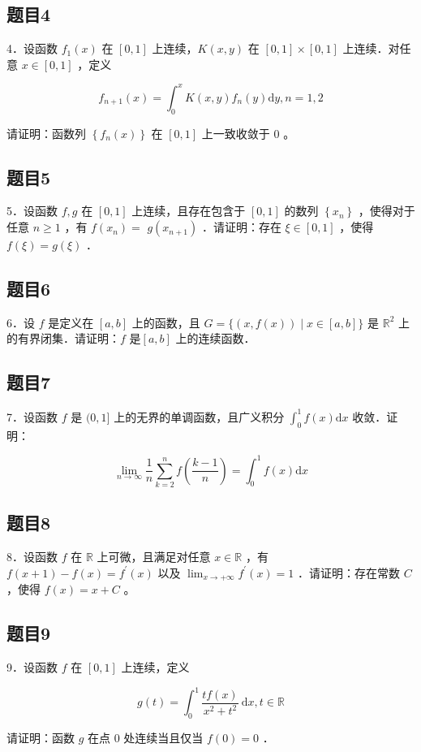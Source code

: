 \documentclass{article}
\begin{document}
\subsection{题目4}
4．设函数 \(f_{1}(x)\) 在 \([0,1]\) 上连续，\(K(x, y)\) 在 \([0,1] \times[0,1]\) 上连续．对任意 \(x \in[0,1]\) ，定义

\[
f_{n+1}(x)=\int_{0}^{x} K(x, y) f_{n}(y) \mathrm{d} y, n=1,2
\]

请证明：函数列 \(\left\{f_{n}(x)\right\}\) 在 \([0,1]\) 上一致收敛于 0 。

\subsection{题目5}
5．设函数 \(f, g\) 在 \([0,1]\) 上连续，且存在包含于 \([0,1]\) 的数列 \(\left\{x_{n}\right\}\) ，使得对于任意 \(n \geq 1\) ，有 \(f\left(x_{n}\right)=\) \(g\left(x_{n+1}\right)\) ．请证明：存在 \(\xi \in[0,1]\) ，使得 \(f(\xi)=g(\xi)\) ．

\subsection{题目6}
6．设 \(f\) 是定义在 \([a, b]\) 上的函数，且 \(G=\{(x, f(x)) \mid x \in[a, b]\}\) 是 \(\mathbb{R}^{2}\) 上的有界闭集．请证明：\(f\) 是\([a, b]\) 上的连续函数．

\subsection{题目7}
7．设函数 \(f\) 是 \((0,1]\) 上的无界的单调函数，且广义积分 \(\int_{0}^{1} f(x) \mathrm{d} x\) 收敛．证明：

\[
\lim _{n \rightarrow \infty} \frac{1}{n} \sum_{k=2}^{n} f\left(\frac{k-1}{n}\right)=\int_{0}^{1} f(x) \mathrm{d} x
\]

\subsection{题目8}
8．设函数 \(f\) 在 \(\mathbb{R}\) 上可微，且满足对任意 \(x \in \mathbb{R}\) ，有 \(f(x+1)-f(x)=f^{\prime}(x)\) 以及 \(\lim _{x \rightarrow+\infty} f^{\prime}(x)=1\) ．请证明：存在常数 \(C\) ，使得 \(f(x)=x+C\) 。

\subsection{题目9}
9．设函数 \(f\) 在 \([0,1]\) 上连续，定义

\[
g(t)=\int_{0}^{1} \frac{t f(x)}{x^{2}+t^{2}} \mathrm{~d} x, t \in \mathbb{R}
\]

请证明：函数 \(g\) 在点 0 处连续当且仅当 \(f(0)=0\) ．
\end{document}
